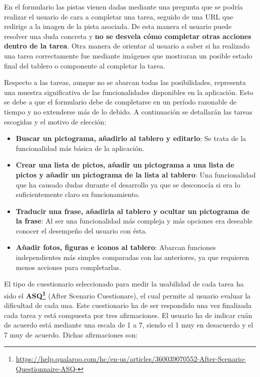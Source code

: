 En el formulario las pistas vienen dadas mediante una pregunta que se podría realizar el usuario de cara a completar una tarea, seguido de una URL que redirige a la imagen de la pista asociada. De esta manera el usuario puede resolver una duda concreta y \textbf{no se desvela cómo completar otras acciones dentro de la tarea}. Otra manera de orientar al usuario a saber si ha realizado una tarea correctamente fue mediante imágenes que mostraran un posible estado final del tablero o componente al completar la tarea. 


Respecto a las tareas, aunque no se abarcan todas las posibilidades, representa una muestra significativa de las funcionalidades disponibles en la aplicación. Esto se debe a que el formulario debe de completarse en un período razonable de tiempo y no extenderse más de lo debido. 
A continuación se detallarán las tareas escogidas y el motivo de elección: 

\begin{itemize}
	\item \textbf{Buscar un pictograma, añadirlo al tablero y editarlo}: Se trata de la funcionalidad más básica de la aplicación.
	\item \textbf{Crear una lista de pictos, añadir un pictograma a una lista de pictos y añadir un pictograma de la lista al tablero}: Una funcionalidad que ha causado dudas durante el desarrollo ya que se desconocía si era lo suficientemente claro su funcionamiento.
	\item \textbf{Traducir una frase, añadirla al tablero y ocultar un pictograma de la frase}: Al ser una funcionalidad más compleja y más opciones era deseable conocer el desempeño del usuario con ésta.
	\item \textbf{Añadir fotos, figuras e iconos al tablero}: Abarcan funciones independientes más simples comparadas con las anteriores, ya que requieren menos acciones para completarlas.
\end{itemize}
El tipo de cuestionario seleccionado para medir la usabilidad de cada tarea ha sido el \textbf{ASQ\footnote{\url{https://help.qualaroo.com/hc/en-us/articles/360039070552-After-Scenario-Questionnaire-ASQ-}}} (After Scenario Cuestionare), el cual permite al usuario evaluar la dificultad de cada una. Este cuestionario ha de ser respondido una vez finalizada cada tarea y está compuesta por tres afirmaciones. El usuario ha de indicar cuán de acuerdo está mediante una escala de 1 a 7, siendo el 1 muy en desacuerdo y el 7 muy de acuerdo. Dichas afirmaciones son: 

